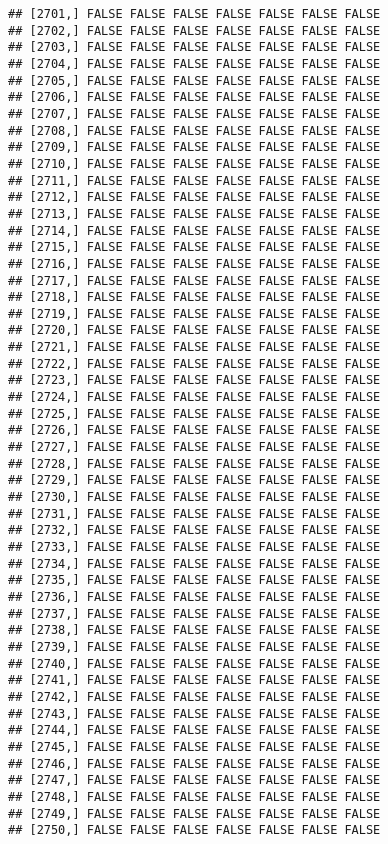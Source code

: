 \documentclass[
]{article}
\begin{document}
\begin{verbatim}
## [2701,] FALSE FALSE FALSE FALSE FALSE FALSE FALSE
## [2702,] FALSE FALSE FALSE FALSE FALSE FALSE FALSE
## [2703,] FALSE FALSE FALSE FALSE FALSE FALSE FALSE
## [2704,] FALSE FALSE FALSE FALSE FALSE FALSE FALSE
## [2705,] FALSE FALSE FALSE FALSE FALSE FALSE FALSE
## [2706,] FALSE FALSE FALSE FALSE FALSE FALSE FALSE
## [2707,] FALSE FALSE FALSE FALSE FALSE FALSE FALSE
## [2708,] FALSE FALSE FALSE FALSE FALSE FALSE FALSE
## [2709,] FALSE FALSE FALSE FALSE FALSE FALSE FALSE
## [2710,] FALSE FALSE FALSE FALSE FALSE FALSE FALSE
## [2711,] FALSE FALSE FALSE FALSE FALSE FALSE FALSE
## [2712,] FALSE FALSE FALSE FALSE FALSE FALSE FALSE
## [2713,] FALSE FALSE FALSE FALSE FALSE FALSE FALSE
## [2714,] FALSE FALSE FALSE FALSE FALSE FALSE FALSE
## [2715,] FALSE FALSE FALSE FALSE FALSE FALSE FALSE
## [2716,] FALSE FALSE FALSE FALSE FALSE FALSE FALSE
## [2717,] FALSE FALSE FALSE FALSE FALSE FALSE FALSE
## [2718,] FALSE FALSE FALSE FALSE FALSE FALSE FALSE
## [2719,] FALSE FALSE FALSE FALSE FALSE FALSE FALSE
## [2720,] FALSE FALSE FALSE FALSE FALSE FALSE FALSE
## [2721,] FALSE FALSE FALSE FALSE FALSE FALSE FALSE
## [2722,] FALSE FALSE FALSE FALSE FALSE FALSE FALSE
## [2723,] FALSE FALSE FALSE FALSE FALSE FALSE FALSE
## [2724,] FALSE FALSE FALSE FALSE FALSE FALSE FALSE
## [2725,] FALSE FALSE FALSE FALSE FALSE FALSE FALSE
## [2726,] FALSE FALSE FALSE FALSE FALSE FALSE FALSE
## [2727,] FALSE FALSE FALSE FALSE FALSE FALSE FALSE
## [2728,] FALSE FALSE FALSE FALSE FALSE FALSE FALSE
## [2729,] FALSE FALSE FALSE FALSE FALSE FALSE FALSE
## [2730,] FALSE FALSE FALSE FALSE FALSE FALSE FALSE
## [2731,] FALSE FALSE FALSE FALSE FALSE FALSE FALSE
## [2732,] FALSE FALSE FALSE FALSE FALSE FALSE FALSE
## [2733,] FALSE FALSE FALSE FALSE FALSE FALSE FALSE
## [2734,] FALSE FALSE FALSE FALSE FALSE FALSE FALSE
## [2735,] FALSE FALSE FALSE FALSE FALSE FALSE FALSE
## [2736,] FALSE FALSE FALSE FALSE FALSE FALSE FALSE
## [2737,] FALSE FALSE FALSE FALSE FALSE FALSE FALSE
## [2738,] FALSE FALSE FALSE FALSE FALSE FALSE FALSE
## [2739,] FALSE FALSE FALSE FALSE FALSE FALSE FALSE
## [2740,] FALSE FALSE FALSE FALSE FALSE FALSE FALSE
## [2741,] FALSE FALSE FALSE FALSE FALSE FALSE FALSE
## [2742,] FALSE FALSE FALSE FALSE FALSE FALSE FALSE
## [2743,] FALSE FALSE FALSE FALSE FALSE FALSE FALSE
## [2744,] FALSE FALSE FALSE FALSE FALSE FALSE FALSE
## [2745,] FALSE FALSE FALSE FALSE FALSE FALSE FALSE
## [2746,] FALSE FALSE FALSE FALSE FALSE FALSE FALSE
## [2747,] FALSE FALSE FALSE FALSE FALSE FALSE FALSE
## [2748,] FALSE FALSE FALSE FALSE FALSE FALSE FALSE
## [2749,] FALSE FALSE FALSE FALSE FALSE FALSE FALSE
## [2750,] FALSE FALSE FALSE FALSE FALSE FALSE FALSE

\end{verbatim}
\end{document}
